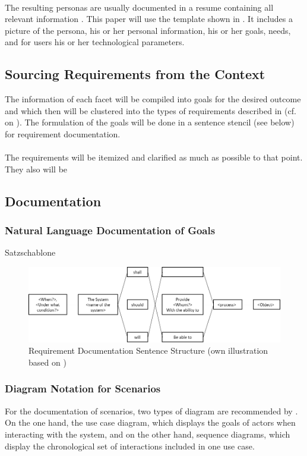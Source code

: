 \paragraph{} The resulting personas are usually documented in a resume containing all relevant information \parencites[cf.][40]{Robier.2016}[cf.][]{Platt.2016}. This paper will use the template shown in . It includes a picture of the persona, his or her personal information, his or her goals, needs, and for users his or her technological parameters.


\subsection{Sourcing Requirements from the Context}
The information of each facet will be compiled into goals for the desired outcome and which then will be clustered into the types of requirements described in  (cf.  on ). The formulation of the goals will be done in a sentence stencil (see below) for requirement documentation. 
\paragraph{} The requirements will be itemized and clarified as much as possible to that point. They also will be 
\clearpage
\subsection{Documentation}
\subsubsection{Natural Language Documentation of Goals}
Satzschablone
\begin{figure}[H]
    \centering
    \includegraphics[width=\textwidth]{img/SentenceStructure.png}
    \caption{Requirement Documentation Sentence Structure (own illustration based on \cite[246]{Pohl.2007})}
    \label{fig:sentencestructure}
\end{figure}
\clearpage
\subsubsection{Diagram Notation for Scenarios}
For the documentation of scenarios, two types of diagram are recommended by \textcite[299]{Pohl.2007}. On the one hand, the use case diagram, which displays the goals of actors when interacting with the system, and on the other hand, sequence diagrams, which display the chronological set of interactions included in one use case.

